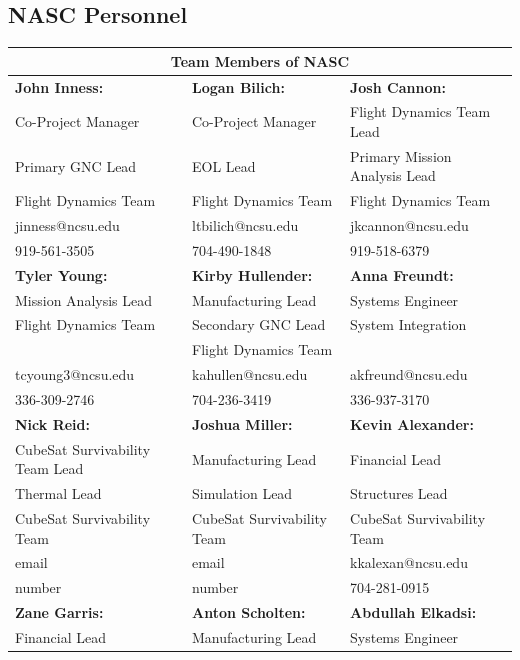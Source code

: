 \documentclass[3p]{elsarticle}
\begin{document}
\subsection{NASC Personnel}
%
\begin{center}
\begin{tabular}{|p{5.3cm}||p{5.3cm}||p{5.3cm}|}
\hline
 \multicolumn{3}{|c|}{Team Members of NASC} \\
 \hline %
 \textbf{John Inness:}&  \textbf{Logan Bilich: }& \textbf{Josh Cannon: }\\ 
 Co-Project Manager   & Co-Project Manager & Flight Dynamics Team Lead   \\
 Primary GNC Lead & EOL Lead & Primary Mission Analysis Lead \\
 Flight Dynamics Team  & Flight Dynamics Team  & Flight Dynamics Team  \\
 jinness@ncsu.edu   & ltbilich@ncsu.edu   & jkcannon@ncsu.edu \\
 919-561-3505  & 704-490-1848 & 919-518-6379 \\
\hline %
 \textbf{Tyler Young: } &  \textbf{Kirby Hullender:} & \textbf{Anna Freundt:}\\ 
  Mission Analysis Lead  & Manufacturing Lead & Systems Engineer   \\
Flight Dynamics Team  & Secondary GNC Lead & System Integration \\
 & Flight Dynamics Team &  \\
 tcyoung3@ncsu.edu   & kahullen@ncsu.edu & akfreund@ncsu.edu  \\
 336-309-2746  & 704-236-3419  & 336-937-3170\\
 \hline %
 \textbf{Nick Reid: }&  \textbf{Joshua Miller: }& \textbf{Kevin Alexander: }\\ 
 CubeSat Survivability Team Lead   & Manufacturing Lead & Financial Lead   \\
 Thermal Lead & Simulation Lead & Structures Lead \\
 CubeSat Survivability Team  & CubeSat Survivability Team  & CubeSat Survivability Team  \\
 email   & email & kkalexan@ncsu.edu  \\
 number  & number & 704-281-0915 \\
 \hline %
 \textbf{Zane Garris: }&  \textbf{Anton Scholten: }& \textbf{Abdullah Elkadsi:}\\ 
 Financial Lead   & Manufacturing Lead & Systems Engineer    \\

\end{tabular}
\end{center}
\end{document}
